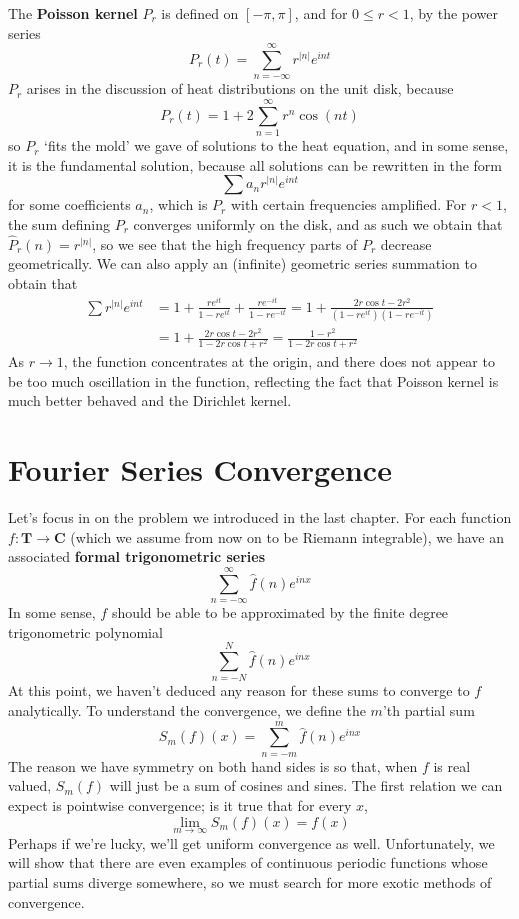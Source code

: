 \begin{example}
    The {\bf Poisson kernel} $P_r$ is defined on $[-\pi,\pi]$, and for $0 \leq r < 1$, by the power series
    \[ P_r(t) = \sum_{n = -\infty}^\infty r^{|n|} e^{int} \]
    $P_r$ arises in the discussion of heat distributions on the unit disk, because
    \[ P_r(t) = 1 + 2 \sum_{n = 1}^\infty r^n \cos(nt) \]
    so $P_r$ `fits the mold' we gave of solutions to the heat equation, and in some sense, it is the fundamental solution, because all solutions can be rewritten in the form
    \[ \sum a_n r^{|n|} e^{int} \]
    for some coefficients $a_n$, which is $P_r$ with certain frequencies amplified. For $r < 1$, the sum defining $P_r$ converges uniformly on the disk, and as such we obtain that $\widehat{P}_r(n) = r^{|n|}$, so we see that the high frequency parts of $P_r$ decrease geometrically. We can also apply an (infinite) geometric series summation to obtain that
    \begin{align*}
        \sum r^{|n|} e^{int} &= 1 + \frac{re^{it}}{1 - re^{it}} + \frac{re^{-it}}{1 - re^{-it}} = 1 + \frac{2r \cos t - 2r^2}{(1 - re^{it})(1 - re^{-it})}\\
        &= 1 + \frac{2r \cos t - 2r^2}{1 - 2r \cos t + r^2} = \frac{1 - r^2}{1 - 2r \cos t + r^2}
    \end{align*}
    As $r \to 1$, the function concentrates at the origin, and there does not appear to be too much oscillation in the function, reflecting the fact that Poisson kernel is much better behaved and the Dirichlet kernel.
\end{example}

\chapter{Fourier Series Convergence}

Let's focus in on the problem we introduced in the last chapter. For each function $f: \mathbf{T} \to \mathbf{C}$ (which we assume from now on to be Riemann integrable), we have an associated {\bf formal trigonometric series}
%
\[ \sum_{n = -\infty}^\infty \widehat{f}(n) e^{inx} \]
%
In some sense, $f$ should be able to be approximated by the finite degree trigonometric polynomial
%
\[ \sum_{n = -N}^N \widehat{f}(n) e^{inx} \]
%
At this point, we haven't deduced any reason for these sums to converge to $f$ analytically. To understand the convergence, we define the $m$'th partial sum
%
\[ S_m(f)(x) = \sum_{n = -m}^m \hat{f}(n) e^{inx} \]
%
The reason we have symmetry on both hand sides is so that, when $f$ is real valued, $S_m(f)$ will just be a sum of cosines and sines. The first relation we can expect is pointwise convergence; is it true that for every $x$,
%
\[ \lim_{m \to \infty} S_m(f)(x) = f(x) \]
%
Perhaps if we're lucky, we'll get uniform convergence as well. Unfortunately, we will show that there are even examples of continuous periodic functions whose partial sums diverge somewhere, so we must search for more exotic methods of convergence.


